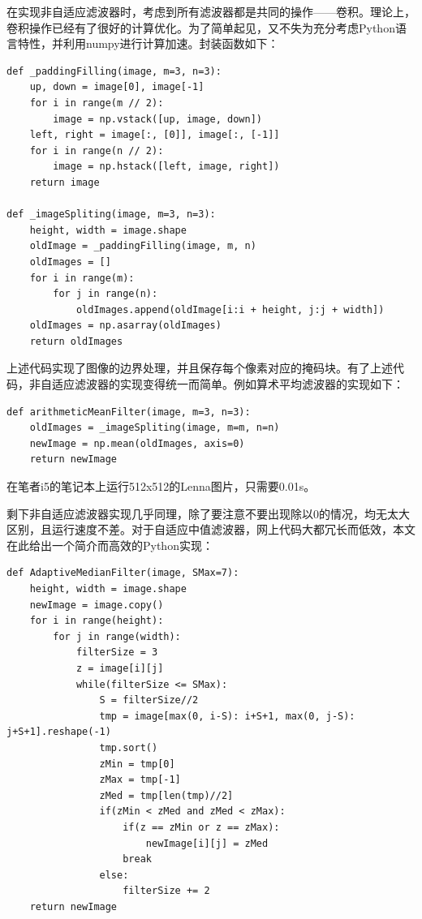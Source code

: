 \documentclass{article}
\begin{document}
在实现非自适应滤波器时，考虑到所有滤波器都是共同的操作——卷积。理论上，卷积操作已经有了很好的计算优化。为了简单起见，又不失为充分考虑Python语言特性，并利用numpy进行计算加速。封装函数如下：

\begin{lstlisting}[title={填充边界，存储掩模}]
def _paddingFilling(image, m=3, n=3):
    up, down = image[0], image[-1]
    for i in range(m // 2):
        image = np.vstack([up, image, down])
    left, right = image[:, [0]], image[:, [-1]]
    for i in range(n // 2):
        image = np.hstack([left, image, right])
    return image

def _imageSpliting(image, m=3, n=3):
    height, width = image.shape
    oldImage = _paddingFilling(image, m, n)
    oldImages = []
    for i in range(m):
        for j in range(n):
            oldImages.append(oldImage[i:i + height, j:j + width])
    oldImages = np.asarray(oldImages)
    return oldImages
\end{lstlisting}

上述代码实现了图像的边界处理，并且保存每个像素对应的掩码块。有了上述代码，非自适应滤波器的实现变得统一而简单。例如算术平均滤波器的实现如下：

\begin{lstlisting}[title={算术平均滤波器}]
def arithmeticMeanFilter(image, m=3, n=3):
    oldImages = _imageSpliting(image, m=m, n=n)
    newImage = np.mean(oldImages, axis=0)
    return newImage
\end{lstlisting}

在笔者i5的笔记本上运行512x512的Lenna图片，只需要0.01s。

剩下非自适应滤波器实现几乎同理，除了要注意不要出现除以0的情况，均无太大区别，且运行速度不差。对于自适应中值滤波器，网上代码大都冗长而低效，本文在此给出一个简介而高效的Python实现：

\begin{lstlisting}[title={自适应中值滤波器}]
def AdaptiveMedianFilter(image, SMax=7):
    height, width = image.shape
    newImage = image.copy()
    for i in range(height):
        for j in range(width):
            filterSize = 3
            z = image[i][j]
            while(filterSize <= SMax):
                S = filterSize//2
                tmp = image[max(0, i-S): i+S+1, max(0, j-S): j+S+1].reshape(-1)
                tmp.sort()
                zMin = tmp[0]
                zMax = tmp[-1]
                zMed = tmp[len(tmp)//2]
                if(zMin < zMed and zMed < zMax):
                    if(z == zMin or z == zMax):
                        newImage[i][j] = zMed
                    break
                else:
                    filterSize += 2
    return newImage
\end{lstlisting}
\end{document}

